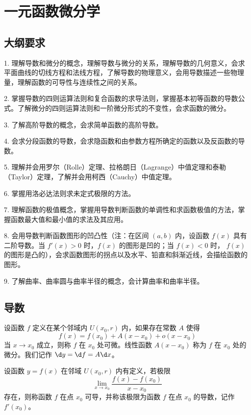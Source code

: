 \section{一元函数微分学}

\subsection{大纲要求}

1. 理解导数和微分的概念，理解导数与微分的关系，理解导数的几何意义，会求平面曲线的切线方程和法线方程，了解导数的物理意义，会用导数描述一些物理量，理解函数的可导性与连续性之间的关系。

2. 掌握导数的四则运算法则和复合函数的求导法则，掌握基本初等函数的导数公式。了解微分的四则运算法则和一阶微分形式的不变性，会求函数的微分。

3. 了解高阶导数的概念，会求简单函数的高阶导数。

4. 会求分段函数的导数，会求隐函数和由参数方程所确定的函数以及反函数的导数。

5. 理解并会用罗尔（Rolle）定理、拉格朗日（Lagrange）中值定理和泰勒（Taylor）定理，了解并会用柯西（Cauchy）中值定理。

6. 掌握用洛必达法则求未定式极限的方法。

7. 理解函数的极值概念，掌握用导数判断函数的单调性和求函数极值的方法，掌握函数最大值和最小值的求法及其应用。

8. 会用导数判断函数图形的凹凸性（注：在区间 $(a, b)$ 内，设函数 $f(x)$ 具有二阶导数。当 $f'(x) > 0$ 时，$f(x)$ 的图形是凹的；当 $f(x) < 0$ 时， $f(x)$ 的图形是凸的），会求函数图形的拐点以及水平、铅直和斜渐近线，会描绘函数的图形。

9. 了解曲率、曲率圆与曲率半径的概念，会计算曲率和曲率半径。

\subsection{导数}

\begin{definition}[微分]
	设函数 $f$ 定义在某个邻域内 $U(x_0, r)$ 内，如果存在常数 $A$ 使得
	\[ f(x) = f(x_0) + A(x - x_0) + o(x - x_0) \]
	当 $x \to x_0$ 成立，则称 $f$ 在 $x_0$ 处可微。线性函数 $A(x-x_0)$ 称为 $f$ 在 $x_0$ 处的微分。我们记作 $\d y = \d f = A \d x$。
\end{definition}

\begin{definition}[导数]
	设函数 $y=f(x)$ 在邻域 $U(x_0, r)$ 内有定义，若极限
	\[ \lim_{x\to x_0}\frac{f(x)-f(x_0)}{x-x_0} \]
	存在，则称函数 $f$ 在点 $x_0$ 可导，并称该极限为函数 $f$ 在点 $x_0$ 的导数，记作 $f'(x_0)$。
\end{definition}

